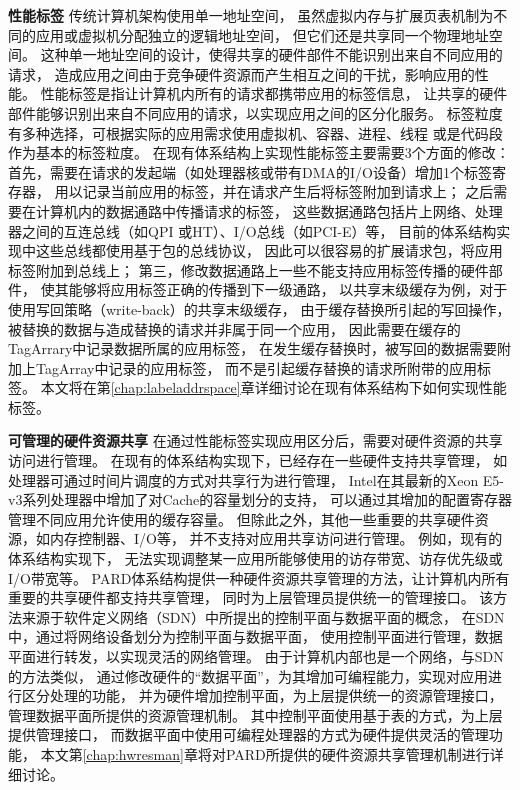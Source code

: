 \textbf{性能标签}\quad
传统计算机架构使用单一地址空间，
虽然虚拟内存与扩展页表机制为不同的应用或虚拟机分配独立的逻辑地址空间，
但它们还是共享同一个物理地址空间。
这种单一地址空间的设计，使得共享的硬件部件不能识别出来自不同应用的请求，
造成应用之间由于竞争硬件资源而产生相互之间的干扰，影响应用的性能。
性能标签是指让计算机内所有的请求都携带应用的标签信息，
让共享的硬件部件能够识别出来自不同应用的请求，以实现应用之间的区分化服务。
标签粒度有多种选择，可根据实际的应用需求使用虚拟机、容器、进程、线程
或是代码段作为基本的标签粒度。
在现有体系结构上实现性能标签主要需要3个方面的修改：
首先，需要在请求的发起端（如处理器核或带有DMA的I/O设备）增加1个标签寄存器，
用以记录当前应用的标签，并在请求产生后将标签附加到请求上；
之后需要在计算机内的数据通路中传播请求的标签，
这些数据通路包括片上网络、处理器之间的互连总线（如QPI\cite{intel-qpi-spec}
或HT\cite{ht-spec}）、I/O总线（如PCI-E\cite{pcisig_pcie_spec}）等，
目前的体系结构实现中这些总线都使用基于包的总线协议，
因此可以很容易的扩展请求包，将应用标签附加到总线上；
第三，修改数据通路上一些不能支持应用标签传播的硬件部件，
使其能够将应用标签正确的传播到下一级通路，
以共享末级缓存为例，对于使用写回策略（write-back）的共享末级缓存，
由于缓存替换所引起的写回操作，被替换的数据与造成替换的请求并非属于同一个应用，
因此需要在缓存的TagArrary中记录数据所属的应用标签，
在发生缓存替换时，被写回的数据需要附加上TagArray中记录的应用标签，
而不是引起缓存替换的请求所附带的应用标签。
本文将在第\ref{chap:labeladdrspace}章详细讨论在现有体系结构下如何实现性能标签。


\textbf{可管理的硬件资源共享}\quad
在通过性能标签实现应用区分后，需要对硬件资源的共享访问进行管理。
在现有的体系结构实现下，已经存在一些硬件支持共享管理，
如处理器可通过时间片调度的方式对共享行为进行管理，
Intel在其最新的Xeon E5-v3系列处理器中增加了对Cache的容量划分的支持\cite{intel-cat}，
可以通过其增加的配置寄存器管理不同应用允许使用的缓存容量。
但除此之外，其他一些重要的共享硬件资源，如内存控制器、I/O等，
并不支持对应用共享访问进行管理。
例如，现有的体系结构实现下，
无法实现调整某一应用所能够使用的访存带宽、访存优先级或I/O带宽等。
PARD体系结构提供一种硬件资源共享管理的方法，让计算机内所有重要的共享硬件都支持共享管理，
同时为上层管理员提供统一的管理接口。
该方法来源于软件定义网络（SDN）中所提出的控制平面与数据平面的概念，
在SDN中，通过将网络设备划分为控制平面与数据平面，
使用控制平面进行管理，数据平面进行转发，以实现灵活的网络管理。
由于计算机内部也是一个网络，与SDN的方法类似，
通过修改硬件的``数据平面''，为其增加可编程能力，实现对应用进行区分处理的功能，
并为硬件增加控制平面，为上层提供统一的资源管理接口，
管理数据平面所提供的资源管理机制。
其中控制平面使用基于表的方式，为上层提供管理接口，
而数据平面中使用可编程处理器的方式为硬件提供灵活的管理功能，
本文第\ref{chap:hwresman}章将对PARD所提供的硬件资源共享管理机制进行详细讨论。


